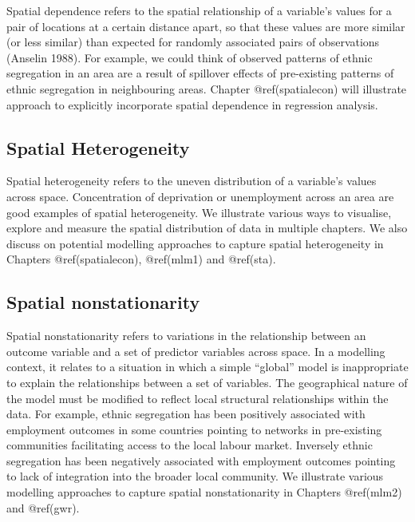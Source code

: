 \documentclass[
  letterpaper,
  DIV=11,
  numbers=noendperiod]{scrreprt}
\begin{document}
Spatial dependence refers to the spatial relationship of a variable's
values for a pair of locations at a certain distance apart, so that
these values are more similar (or less similar) than expected for
randomly associated pairs of observations (Anselin 1988). For example,
we could think of observed patterns of ethnic segregation in an area are
a result of spillover effects of pre-existing patterns of ethnic
segregation in neighbouring areas. Chapter @ref(spatialecon) will
illustrate approach to explicitly incorporate spatial dependence in
regression analysis.

\hypertarget{spatial-heterogeneity}{%
\subsection{Spatial Heterogeneity}\label{spatial-heterogeneity}}

Spatial heterogeneity refers to the uneven distribution of a variable's
values across space. Concentration of deprivation or unemployment across
an area are good examples of spatial heterogeneity. We illustrate
various ways to visualise, explore and measure the spatial distribution
of data in multiple chapters. We also discuss on potential modelling
approaches to capture spatial heterogeneity in Chapters
@ref(spatialecon), @ref(mlm1) and @ref(sta).

\hypertarget{spatial-nonstationarity}{%
\subsection{Spatial nonstationarity}\label{spatial-nonstationarity}}

Spatial nonstationarity refers to variations in the relationship between
an outcome variable and a set of predictor variables across space. In a
modelling context, it relates to a situation in which a simple
``global'' model is inappropriate to explain the relationships between a
set of variables. The geographical nature of the model must be modified
to reflect local structural relationships within the data. For example,
ethnic segregation has been positively associated with employment
outcomes in some countries pointing to networks in pre-existing
communities facilitating access to the local labour market. Inversely
ethnic segregation has been negatively associated with employment
outcomes pointing to lack of integration into the broader local
community. We illustrate various modelling approaches to capture spatial
nonstationarity in Chapters @ref(mlm2) and @ref(gwr).
\end{document}
